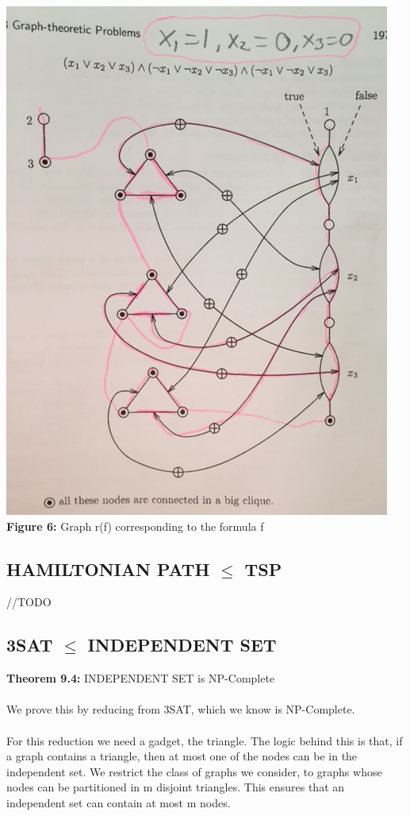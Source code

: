 \begin{center}
\includegraphics[scale=0.5, angle =-90]{3SATtoHAM}\\
\textbf{Figure 6:} Graph r(f) corresponding to the formula f
\end{center}

\newpage
\subsection{HAMILTONIAN PATH $\le$ TSP}
//TODO

\subsection{3SAT $\le$ INDEPENDENT SET}
\textbf{Theorem 9.4:} INDEPENDENT SET is NP-Complete\\\\
We prove this by reducing from 3SAT, which we know is NP-Complete.\\\\
For this reduction we need a gadget, the triangle. The logic behind this is that, if a graph contains a triangle, then at most one of the nodes can be in the independent set. We restrict the class of graphs we consider, to graphs whose nodes can be partitioned in m disjoint triangles. This ensures that an independent set can contain at most m nodes. \\

